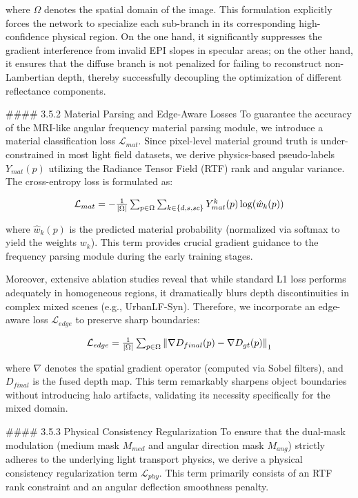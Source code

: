 \documentclass[journal]{IEEEtran}
\begin{document}
where $\Omega$ denotes the spatial domain of the image. This formulation explicitly forces the network to specialize each sub-branch in its corresponding high-confidence physical region. On the one hand, it significantly suppresses the gradient interference from invalid EPI slopes in specular areas; on the other hand, it ensures that the diffuse branch is not penalized for failing to reconstruct non-Lambertian depth, thereby successfully decoupling the optimization of different reflectance components.

\#\#\#\# 3.5.2 Material Parsing and Edge-Aware Losses
To guarantee the accuracy of the MRI-like angular frequency material parsing module, we introduce a material classification loss $\mathcal{L}_{mat}$. Since pixel-level material ground truth is under-constrained in most light field datasets, we derive physics-based pseudo-labels $Y_{mat}(p)$ utilizing the Radiance Tensor Field (RTF) rank and angular variance. The cross-entropy loss is formulated as:

\[
$$ \mathcal{L}_{mat} = - \frac{1}{|\Omega|} \sum_{p \in \Omega} \sum_{k \in \{d, s, sc\}} Y_{mat}^k(p) \log(\hat{w}_k(p)) $$
\]

where $\hat{w}_k(p)$ is the predicted material probability (normalized via softmax to yield the weights $w_k$). This term provides crucial gradient guidance to the frequency parsing module during the early training stages.

Moreover, extensive ablation studies reveal that while standard L1 loss performs adequately in homogeneous regions, it dramatically blurs depth discontinuities in complex mixed scenes (e.g., UrbanLF-Syn). Therefore, we incorporate an edge-aware loss $\mathcal{L}_{edge}$ to preserve sharp boundaries:

\[
$$ \mathcal{L}_{edge} = \frac{1}{|\Omega|} \sum_{p \in \Omega} \left\| \nabla D_{final}(p) - \nabla D_{gt}(p) \right\|_1 $$
\]

where $\nabla$ denotes the spatial gradient operator (computed via Sobel filters), and $D_{final}$ is the fused depth map. This term remarkably sharpens object boundaries without introducing halo artifacts, validating its necessity specifically for the mixed domain.

\#\#\#\# 3.5.3 Physical Consistency Regularization
To ensure that the dual-mask modulation (medium mask $M_{med}$ and angular direction mask $M_{ang}$) strictly adheres to the underlying light transport physics, we derive a physical consistency regularization term $\mathcal{L}_{phy}$. This term primarily consists of an RTF rank constraint and an angular deflection smoothness penalty.
\end{document}
